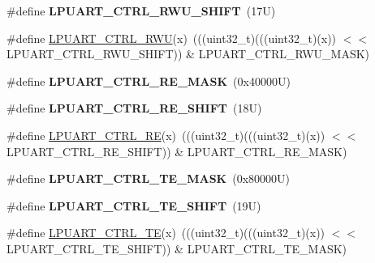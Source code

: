 \begin{DoxyCompactItemize}
\#define {\bfseries L\+P\+U\+A\+R\+T\+\_\+\+C\+T\+R\+L\+\_\+\+R\+W\+U\+\_\+\+S\+H\+I\+FT}~(17\+U)
\item 
\#define \mbox{\hyperlink{group___l_p_u_a_r_t___register___masks_ga64c0a830eae785e415d429810a3ebec6}{L\+P\+U\+A\+R\+T\+\_\+\+C\+T\+R\+L\+\_\+\+R\+WU}}(x)~(((uint32\+\_\+t)(((uint32\+\_\+t)(x)) $<$$<$ L\+P\+U\+A\+R\+T\+\_\+\+C\+T\+R\+L\+\_\+\+R\+W\+U\+\_\+\+S\+H\+I\+FT)) \& L\+P\+U\+A\+R\+T\+\_\+\+C\+T\+R\+L\+\_\+\+R\+W\+U\+\_\+\+M\+A\+SK)
\item 
\mbox{\label{group___l_p_u_a_r_t___register___masks_ga4dc1f3b5d86e60c482705ebda3f6e8b8}} 
\#define {\bfseries L\+P\+U\+A\+R\+T\+\_\+\+C\+T\+R\+L\+\_\+\+R\+E\+\_\+\+M\+A\+SK}~(0x40000\+U)
\item 
\mbox{\label{group___l_p_u_a_r_t___register___masks_ga2c7e434ab3a3e2b152a3d1bc2d354455}} 
\#define {\bfseries L\+P\+U\+A\+R\+T\+\_\+\+C\+T\+R\+L\+\_\+\+R\+E\+\_\+\+S\+H\+I\+FT}~(18\+U)
\item 
\#define \mbox{\hyperlink{group___l_p_u_a_r_t___register___masks_gab2f22da3d7c7b630d7db7199cdfe1c2b}{L\+P\+U\+A\+R\+T\+\_\+\+C\+T\+R\+L\+\_\+\+RE}}(x)~(((uint32\+\_\+t)(((uint32\+\_\+t)(x)) $<$$<$ L\+P\+U\+A\+R\+T\+\_\+\+C\+T\+R\+L\+\_\+\+R\+E\+\_\+\+S\+H\+I\+FT)) \& L\+P\+U\+A\+R\+T\+\_\+\+C\+T\+R\+L\+\_\+\+R\+E\+\_\+\+M\+A\+SK)
\item 
\mbox{\label{group___l_p_u_a_r_t___register___masks_ga70240ad2f80b6b757515f421c5c79a36}} 
\#define {\bfseries L\+P\+U\+A\+R\+T\+\_\+\+C\+T\+R\+L\+\_\+\+T\+E\+\_\+\+M\+A\+SK}~(0x80000\+U)
\item 
\mbox{\label{group___l_p_u_a_r_t___register___masks_gaf47babf1aa00d18a47588eb367f132fc}} 
\#define {\bfseries L\+P\+U\+A\+R\+T\+\_\+\+C\+T\+R\+L\+\_\+\+T\+E\+\_\+\+S\+H\+I\+FT}~(19\+U)
\item 
\#define \mbox{\hyperlink{group___l_p_u_a_r_t___register___masks_ga13fd13a3e9951b04010be4d08d6e5915}{L\+P\+U\+A\+R\+T\+\_\+\+C\+T\+R\+L\+\_\+\+TE}}(x)~(((uint32\+\_\+t)(((uint32\+\_\+t)(x)) $<$$<$ L\+P\+U\+A\+R\+T\+\_\+\+C\+T\+R\+L\+\_\+\+T\+E\+\_\+\+S\+H\+I\+FT)) \& L\+P\+U\+A\+R\+T\+\_\+\+C\+T\+R\+L\+\_\+\+T\+E\+\_\+\+M\+A\+SK)
\item 
\mbox{\label{group___l_p_u_a_r_t___register___masks_ga0240e86032be2a661b5a1737b971570a}} 
$$
\end{DoxyCompactItemize}
